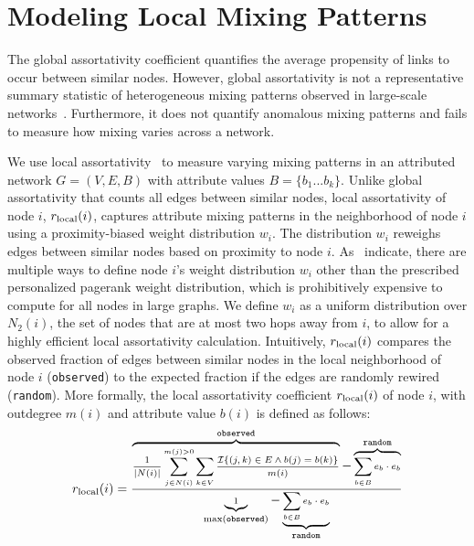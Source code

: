 \section{Modeling Local Mixing Patterns}
\label{subsec:LocalMixing}

The global assortativity coefficient quantifies
the average propensity of links to occur between similar nodes.
However, global assortativity is not a representative summary statistic of
heterogeneous mixing patterns observed in large-scale networks~\cite{peel2018multiscale}.
Furthermore, it does not quantify anomalous mixing patterns and fails to measure how mixing varies across a network.

We use local assortativity~\cite{peel2018multiscale} to measure varying
mixing patterns in an attributed network $G=(V,E,B)$ with attribute values $B=\{b_1...b_k\}$.
Unlike global assortativity that counts all edges between similar nodes, local assortativity
of node $i$, $r_{\scriptsize\mbox{local}}(i)$, captures attribute mixing patterns in the neighborhood of node
$i$ using a proximity-biased weight distribution $w_i$. The distribution
$w_i$ reweighs edges between similar nodes based on proximity to
node $i$. As~\citet{peel2018multiscale} indicate, there are multiple ways
to define node $i$'s weight distribution $w_i$ other than the prescribed
personalized pagerank weight distribution, which is prohibitively expensive to compute
for all nodes in large graphs.
We define $w_i$ as a uniform distribution over $N_2(i)$, the set of nodes that
are at most two hops away from $i$, to allow for a highly efficient
local assortativity calculation.
Intuitively, $r_{\scriptsize\mbox{local}}(i)$ compares the observed fraction of edges between similar nodes
in the local neighborhood of node $i$ (\texttt{observed}) to the expected fraction
if the edges are randomly rewired (\texttt{random}).
More formally, the local assortativity coefficient $r_{\scriptsize\mbox{local}}(i)$ of node $i$, with outdegree $m(i)$ and
attribute value $b(i)$ is defined as follows:
\begin{align*}
	\scriptsize r_{\scriptsize\mbox{local}}(i) = \frac{\overbrace{\frac{1}{|N(i)|}\sum\limits_{j \in N(i)}^{m(j) > 0} \sum_{k \in V} \frac{\mathcal{I}\{(j,k) \in E \wedge b(j)=b(k)\}}{m(i)} }^{\texttt{observed}}-\overbrace{\sum_{b \in B} e_{b}\cdot e_{b}}^{\texttt{random}}}{\underbrace{1}_{\max(\texttt{observed})}-\underbrace{\sum_{b \in B} e_{b} \cdot e_{b}}_\texttt{random}}
\end{align*}

